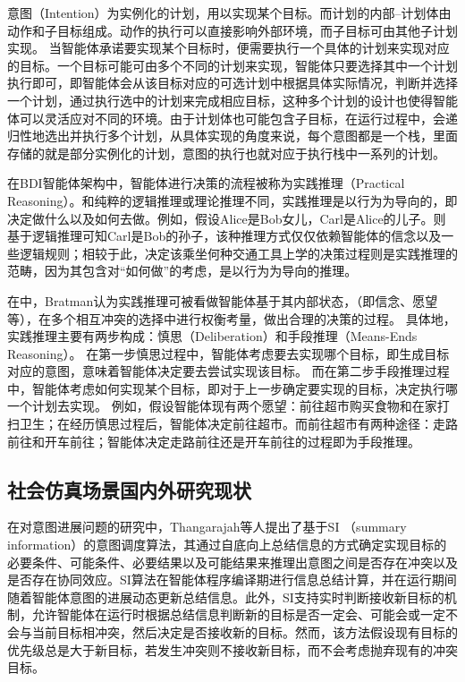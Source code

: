 意图（Intention）为实例化的计划，用以实现某个目标。而计划的内部--计划体由动作和子目标组成。动作的执行可以直接影响外部环境，而子目标可由其他子计划实现。 当智能体承诺要实现某个目标时，便需要执行一个具体的计划来实现对应的目标。一个目标可能可由多个不同的计划来实现，智能体只要选择其中一个计划执行即可，即智能体会从该目标对应的可选计划中根据具体实际情况，判断并选择一个计划，通过执行选中的计划来完成相应目标，这种多个计划的设计也使得智能体可以灵活应对不同的环境。由于计划体也可能包含子目标，在运行过程中，会递归性地选出并执行多个计划，从具体实现的角度来说，每个意图都是一个栈，里面存储的就是部分实例化的计划，意图的执行也就对应于执行栈中一系列的计划。

在BDI智能体架构中，智能体进行决策的流程被称为实践推理（Practical Reasoning）。和纯粹的逻辑推理或理论推理不同，实践推理是以行为为导向的，即决定做什么以及如何去做。例如，假设Alice是Bob女儿，Carl是Alice的儿子。则基于逻辑推理可知Carl是Bob的孙子，该种推理方式仅仅依赖智能体的信念以及一些逻辑规则；相较于此，决定该乘坐何种交通工具上学的决策过程则是实践推理的范畴，因为其包含对“如何做”的考虑，是以行为为导向的推理。

在\cite{bratman1987intention}中，Bratman认为实践推理可被看做智能体基于其内部状态，（即信念、愿望等），在多个相互冲突的选择中进行权衡考量，做出合理的决策的过程。
%
具体地，实践推理主要有两步构成：慎思（Deliberation）和手段推理（Means-Ends Reasoning）。
%
在第一步慎思过程中，智能体考虑要去实现哪个目标，即生成目标对应的意图，意味着智能体决定要去尝试实现该目标。
%
而在第二步手段推理过程中，智能体考虑如何实现某个目标，即对于上一步确定要实现的目标，决定执行哪一个计划去实现。
例如，假设智能体现有两个愿望：前往超市购买食物和在家打扫卫生；在经历慎思过程后，智能体决定前往超市。而前往超市有两种途径：走路前往和开车前往；智能体决定走路前往还是开车前往的过程即为手段推理。

\subsection{社会仿真场景国内外研究现状}
在对意图进展问题的研究中，Thangarajah等人提出了基于SI （summary information）\cite{DBLP:journals/jar/ThangarajahP11,DBLP:conf/ijcai/ThangarajahPW03}的意图调度算法，其通过自底向上总结信息的方式确定实现目标的必要条件、可能条件、必要结果以及可能结果来推理出意图之间是否存在冲突以及是否存在协同效应。SI算法在智能体程序编译期进行信息总结计算，并在运行期间随着智能体意图的进展动态更新总结信息。此外，SI支持实时判断接收新目标的机制，允许智能体在运行时根据总结信息判断新的目标是否一定会、可能会或一定不会与当前目标相冲突，然后决定是否接收新的目标。然而，该方法假设现有目标的优先级总是大于新目标，若发生冲突则不接收新目标，而不会考虑抛弃现有的冲突目标。

